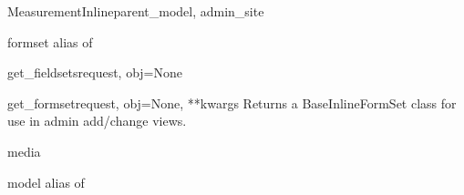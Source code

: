 \documentclass[letterpaper,10pt,english]{sphinxmanual}
\begin{document}
\begin{classdesc}{MeasurementInline}{parent\_model, admin\_site}
\hypertarget{data.admin.MeasurementInline.formset}{}\begin{memberdesc}{formset}
alias of 
\end{memberdesc}

\hypertarget{data.admin.MeasurementInline.get_fieldsets}{}\begin{methoddesc}{get\_fieldsets}{request, obj=None}\end{methoddesc}

\hypertarget{data.admin.MeasurementInline.get_formset}{}\begin{methoddesc}{get\_formset}{request, obj=None, **kwargs}
Returns a BaseInlineFormSet class for use in admin add/change views.
\end{methoddesc}

\hypertarget{data.admin.MeasurementInline.media}{}\begin{memberdesc}{media}\end{memberdesc}

\hypertarget{data.admin.MeasurementInline.model}{}\begin{memberdesc}{model}
alias of 
\end{memberdesc}
\end{classdesc}
\end{document}
